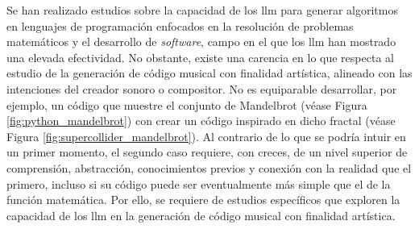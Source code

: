 Se han realizado estudios sobre la capacidad de los \gls{llm} para generar algoritmos en lenguajes de programación enfocados en la resolución de problemas matemáticos y el desarrollo de \emph{software}, campo en el que los \gls{llm} han mostrado una elevada efectividad. No obstante, existe una carencia en lo que respecta al estudio de la generación de código musical con finalidad artística, alineado con las intenciones del creador sonoro o compositor. No es equiparable desarrollar, por ejemplo, un código que muestre el conjunto de Mandelbrot (véase Figura \ref{fig:python_mandelbrot}) con crear un código inspirado en dicho fractal (véase Figura \ref{fig:supercollider_mandelbrot}). Al contrario de lo que se podría intuir en un primer momento, el segundo caso requiere, con creces, de un nivel superior de comprensión, abstracción, conocimientos previos y conexión con la realidad que el primero, incluso si su código puede ser eventualmente más simple que el de la función matemática. Por ello, se requiere de estudios específicos que exploren la capacidad de los \gls{llm} en la generación de código musical con finalidad artística.

